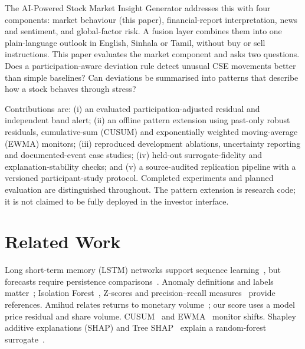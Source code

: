 \documentclass[conference]{IEEEtran}
\begin{document}
The AI-Powered Stock Market Insight Generator addresses this with four components: market behaviour (this paper), financial-report interpretation, news and sentiment, and global-factor risk. A fusion layer combines them into one plain-language outlook in English, Sinhala or Tamil, without buy or sell instructions. This paper evaluates the market component and asks two questions. Does a participation-aware deviation rule detect unusual CSE movements better than simple baselines? Can deviations be summarised into patterns that describe how a stock behaves through stress?

Contributions are: (i) an evaluated participation-adjusted residual and independent band alert; (ii) an offline pattern extension using past-only robust residuals, cumulative-sum (CUSUM) and exponentially weighted moving-average (EWMA) monitors; (iii) reproduced development ablations, uncertainty reporting and documented-event case studies; (iv) held-out surrogate-fidelity and explanation-stability checks; and (v) a source-audited replication pipeline with a versioned participant-study protocol. Completed experiments and planned evaluation are distinguished throughout. The pattern extension is research code; it is not claimed to be fully deployed in the investor interface.

\section{Related Work}
Long short-term memory (LSTM) networks support sequence learning~\cite{hochreiter1997}, but forecasts require persistence comparisons~\cite{hyndman2021}. Anomaly definitions and labels matter~\cite{chandola2009}; Isolation Forest~\cite{liu2008}, Z-scores and precision--recall measures~\cite{saito2015} provide references. Amihud relates returns to monetary volume~\cite{amihud2002}; our score uses a model price residual and share volume. CUSUM~\cite{page1954} and EWMA~\cite{roberts1959} monitor shifts. Shapley additive explanations (SHAP) and Tree SHAP~\cite{lundberg2017,lundberg2020} explain a random-forest surrogate~\cite{breiman2001}.
\end{document}
